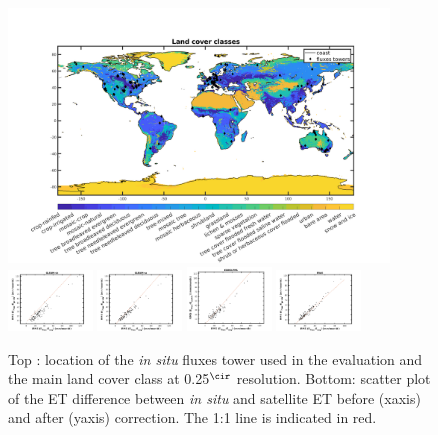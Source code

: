 \documentclass[draft]{agujournal2019}
\begin{document}
\begin{figure}[h]
\centering
\includegraphics[width=0.9\textwidth]{LCC_025.png}
\includegraphics[width=0.2\textwidth]{squatter_rmse1.png}
\includegraphics[width=0.2\textwidth]{squatter_rmse2.png}
\includegraphics[width=0.2\textwidth]{squatter_rmse3.png}
\includegraphics[width=0.2\textwidth]{squatter_rmse4.png}
\caption{Top : location of the {\it in situ} fluxes tower used in the evaluation and the main land cover class at 0.25$^\cir$ resolution. Bottom: scatter plot of the ET difference between {\it in situ} and satellite ET before (xaxis) and after (yaxis) correction. The 1:1 line is indicated in red.}
\end{figure}
\end{document}
